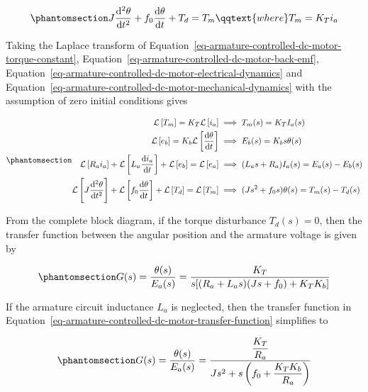 \documentclass[
  14pt,
  a4paper,
  oneside,
  open=any,
  a4paper,
  14pt]{report}
\begin{document}
\begin{equation}\phantomsection\label{eq-armature-controlled-dc-motor-mechanical-dynamics}{
    J \odv[2]{\theta}{t} + f_0 \odv{\theta}{t} + T_d = T_m \qqtext{where} T_m = K_T i_a
}\end{equation}

Taking the Laplace transform of
Equation~\ref{eq-armature-controlled-dc-motor-torque-constant},
Equation~\ref{eq-armature-controlled-dc-motor-back-emf},
Equation~\ref{eq-armature-controlled-dc-motor-electrical-dynamics} and
Equation~\ref{eq-armature-controlled-dc-motor-mechanical-dynamics} with
the assumption of zero initial conditions gives

\begin{equation}\phantomsection\label{eq-armature-controlled-dc-motor-laplace-transformed}{
\begin{aligned}
    \mathcal{L}\left[T_m \right] = K_T \mathcal{L}\left[ i_a \right] &\implies T_m(s) = K_TI_a(s) \\
    \mathcal{L}\left[e_b \right] = K_b \mathcal{L}\left[\odv{\theta}{t} \right] &\implies E_b(s) = K_bs \theta(s) \\
    \mathcal{L}\left[R_ai_a \right] + \mathcal{L}\left[L_a\odv{i_a}{t}\right] + \mathcal{L}\left[e_b\right] = \mathcal{L}\left[e_a\right] &\implies (L_as + R_a)I_a(s) = E_a(s) - E_b(s) \\
    \mathcal{L}\left[J\odv[2]{\theta}{t}\right] + \mathcal{L}\left[f_0 \odv{\theta}{t}\right] + \mathcal{L}\left[T_d\right] = \mathcal{L}\left[T_m\right] &\implies (Js^2+f_0s)\theta(s) = T_m(s) - T_d(s)
\end{aligned}
}\end{equation}

From the complete block diagram, if the torque disturbance
\(T_d(s) = 0\), then the transfer function between the angular position
and the armature voltage is given by

\begin{equation}\phantomsection\label{eq-armature-controlled-dc-motor-transfer-function}{
    G(s) = \dfrac{\theta(s)}{E_a(s)} = \dfrac{K_T}{s[(R_a + L_a s)(Js + f_0) + K_T K_b]}
}\end{equation}

If the armature circuit inductance \(L_a\) is neglected, then the
transfer function in
Equation~\ref{eq-armature-controlled-dc-motor-transfer-function}
simplifies to

\begin{equation}\phantomsection\label{eq-armature-controlled-dc-motor-transfer-function-no-inductance}{
    G(s) = \dfrac{\theta(s)}{E_a(s)} = \dfrac{\dfrac{K_T}{R_a}}{Js^2 + s\left(f_0 + \dfrac{K_T K_b}{R_a}\right)}
}\end{equation}
\end{document}
